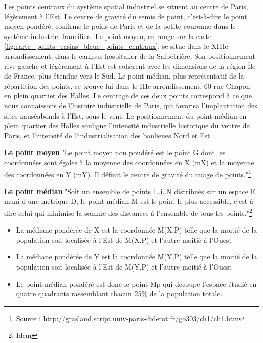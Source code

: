 \documentclass[a4paper,twoside,12pt]{book}
\begin{document}
Les points centraux du système spatial industriel se situent au centre de Paris, légèrement à l'Est. Le centre de gravité du semis de point, c'est-à-dire le point moyen pondéré, confirme le poids de Paris et de la petite couronne dans le système industriel francilien. Le point moyen, en rouge sur la carte \ref{fig:carte_points_casias_bleue_points_centraux}, se situe dans le XIIIe arrondissement, dans le campus hospitalier de la Salpétrière. Son positionnement rive gauche et légèrement à l'Est est cohérent avec les dimensions de la région Île-de-France, plus étendue vers le Sud. Le point médian, plus représentatif de la répartition des points, se trouve lui dans le IIIe arrondissement, 60 rue Chapon en plein quartier des Halles. Le centrage de ces deux points correspond à ce que nous connaissons de l'histoire industrielle de Paris, qui favorisa l'implantation des sites nauséabonds à l'Est, sous le vent. Le positionnement du point médian en plein quartier des Halles souligne l'intensité industrielle historique du ventre de Paris, et l'intensité de l'industrialisation des banlieues Nord et Est. 

\begin{tcolorbox}[colback=gray!5!white,colframe=gray!20!white]

\textbf{Le point moyen}
"Le point moyen non pondéré est le point G dont les coordonnées sont égales à la moyenne des coordonnées en X (mX) et la moyenne des coordonnées en Y (mY). Il définit le centre de gravité du nuage de points."\footnote{Source : \url{http://grasland.script.univ-paris-diderot.fr/go303/ch1/ch1.htm}} 

\textbf{Le point médian}
"Soit un ensemble de points 1..i..N distribués sur un espace E muni d'une métrique D, le point médian M est le point le plus accessible, c'est-à-dire celui qui minimise la somme des distances à l'ensemble de tous les points."\footnote{Idem} 

\begin{itemize} 
\item La médiane pondérée de X est la coordonnée M(X,P) telle que la moitié de la population soit localisée à l'Est de M(X,P) et l'autre moitié à l'Ouest 
\item La médiane pondérée de Y est la coordonnée M(Y,P) telle que la moitié de la population soit localisée à l'Est de M(Y,P) et l'autre moitié à l'Ouest 
\item Le point médian pondéré est donc le point Mp qui découpe l'espace étudié en quatre quadrants rassemblant chacun 25\% de la population totale.
\end{itemize}
\end{tcolorbox} 
\end{document}
